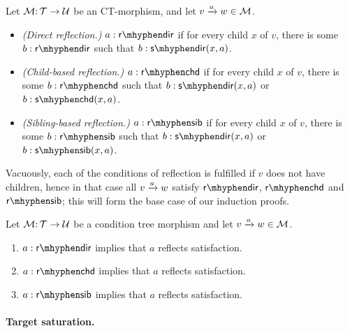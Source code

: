 \begin{definition}\label{def:syntactic reflection}
Let ${\mathcal{M}}{:}\, {\mathcal{T}}\rightarrow{\mathcal{U}}$ be an CT-morphism, and let ${v}\xrightarrow{a}{w}\in{\mathcal{M}}$.
\begin{itemize}[topsep=\smallskipamount]
\item \emph{(Direct reflection.)} $a:\rdir$ if for every child $x$ of $v$, there is some $b:\rdir$ such that $\issdir b{x,a}$.
\item \emph{(Child-based reflection.)} $a:\rchd$ if for every child $x$ of $v$, there is some $b:\rchd$ such that $\issdir b{x,a}$ or $\isschd b{x,a}$.
\item \emph{(Sibling-based reflection.)} $a:\rsib$ if for every child $x$ of $v$, there is some $b:\rsib$ such that $\issdir b{x,a}$ or $\isssib b{x,a}$.
\end{itemize}
\end{definition}

Vacuously, each of the conditions of reflection is fulfilled if $v$ does not have children, hence in that case all ${v}\xrightarrow{a}{w}$ satisfy $\rdir$, $\rchd$ and $\rsib$; this will form the base case of our induction proofs.

\begin{lemma}\label{lem:reflection}
Let ${\mathcal{M}}{:}\,{\mathcal{T}}\rightarrow{\mathcal{U}}$ be a condition tree morphism and let ${v}\xrightarrow{a}{w}\in{\mathcal{M}}$.
\begin{enumerate}[topsep=\smallskipamount]
\item $a:\rdir$ implies that $a$ reflects satisfaction. 
\item $a:\rchd$ implies that $a$ reflects satisfaction. 
\item $a:\rsib$ implies that $a$ reflects satisfaction. 
\end{enumerate}
\end{lemma}

\paragraph{Target saturation.}

